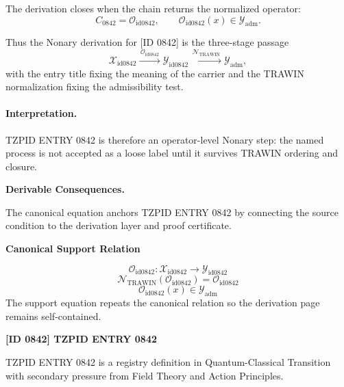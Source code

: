 The derivation closes when the chain returns the normalized operator:\[
C_{0842}=\mathcal{O}_{\mathrm{id0842}},\qquad \mathcal{O}_{\mathrm{id0842}}(x)\in\mathcal{Y}_{\mathrm{adm}}.
\]

Thus the Nonary derivation for [ID 0842] is the three-stage passage
\[
\mathcal{X}_{\mathrm{id0842}}\xrightarrow{\,\mathcal{O}_{\mathrm{id0842}}\,} \mathcal{Y}_{\mathrm{id0842}}\xrightarrow{\,\mathcal{N}_{\mathrm{TRAWIN}}\,} \mathcal{Y}_{\mathrm{adm}},
\]
with the entry title fixing the meaning of the carrier and the TRAWIN normalization fixing the admissibility test.

\paragraph{Interpretation.} TZPID ENTRY 0842 is therefore an operator-level Nonary step: the named process is not accepted as a loose label until it survives TRAWIN ordering and closure.

\par\vspace{0.35em}
\noindent\textbf{Derivable Consequences.}\quad
\begingroup
\footnotesize
\raggedright
The canonical equation anchors TZPID ENTRY 0842 by connecting the source condition to the derivation layer and proof certificate.
\par\endgroup

\noindent\textbf{Canonical Support Relation}\par
\[
\mathcal{O}_{\mathrm{id0842}}:\mathcal{X}_{\mathrm{id0842}}\longrightarrow\mathcal{Y}_{\mathrm{id0842}}
\]
\[
\mathcal{N}_{\mathrm{TRAWIN}}(\mathcal{O}_{\mathrm{id0842}})=\mathcal{O}_{\mathrm{id0842}}
\]
\[
\mathcal{O}_{\mathrm{id0842}}(x)\in\mathcal{Y}_{\mathrm{adm}}
\]
\noindent The support equation repeats the canonical relation so the derivation page remains self-contained.\par

\clearpage
\noindent\textbf{[ID 0842] TZPID ENTRY 0842}\par
\vspace{0.35em}
\begingroup\small
{}
TZPID ENTRY 0842 is a registry definition in Quantum-Classical Transition with secondary pressure from Field Theory and Action Principles.

